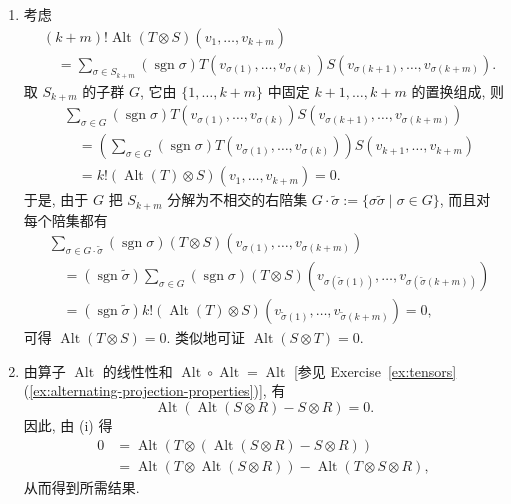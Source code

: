 \begin{RiemannProof}
\begin{enumerate}[label=(\roman*),leftmargin=*]
\item 考虑
\begin{align*}
  &(k+m)!\operatorname{Alt}(T\otimes S)(v_1,\ldots,v_{k+m})\\
  &\quad=\sum_{\sigma\in S_{k+m}}(\operatorname{sgn}\sigma)
  T(v_{\sigma(1)},\ldots,v_{\sigma(k)})S(v_{\sigma(k+1)},\ldots,v_{\sigma(k+m)}).
\end{align*}
取 $S_{k+m}$ 的子群 $G$, 它由 $\{1,\ldots,k+m\}$ 中固定 $k+1,\ldots,k+m$ 的置换组成, 则
\begin{align*}
  &\sum_{\sigma\in G}(\operatorname{sgn}\sigma)
    T(v_{\sigma(1)},\ldots,v_{\sigma(k)})S(v_{\sigma(k+1)},\ldots,v_{\sigma(k+m)})\\
  &\quad=\left(\sum_{\sigma\in G}(\operatorname{sgn}\sigma)
    T(v_{\sigma(1)},\ldots,v_{\sigma(k)})\right)S(v_{k+1},\ldots,v_{k+m})\\
  &\quad=k!(\operatorname{Alt}(T)\otimes S)(v_1,\ldots,v_{k+m})=0.
\end{align*}
于是, 由于 $G$ 把 $S_{k+m}$ 分解为不相交的右陪集 $G\cdot\widetilde\sigma:=\{\sigma\widetilde\sigma\mid\sigma\in G\}$, 而且对每个陪集都有
\begin{align*}
  &\sum_{\sigma\in G\cdot\widetilde\sigma}(\operatorname{sgn}\sigma)
     (T\otimes S)(v_{\sigma(1)},\ldots,v_{\sigma(k+m)})\\
  &\quad=(\operatorname{sgn}\widetilde\sigma)\sum_{\sigma\in G}
    (\operatorname{sgn}\sigma)(T\otimes S)
    (v_{\sigma(\widetilde\sigma(1))},\ldots,v_{\sigma(\widetilde\sigma(k+m))})\\
  &\quad=(\operatorname{sgn}\widetilde\sigma)k!(\operatorname{Alt}(T)\otimes S)
     (v_{\widetilde\sigma(1)},\ldots,v_{\widetilde\sigma(k+m)})=0,
\end{align*}
可得 $\operatorname{Alt}(T\otimes S)=0$. 类似地可证 $\operatorname{Alt}(S\otimes T)=0$.
\item 由算子 $\operatorname{Alt}$ 的线性性和 $\operatorname{Alt}\circ\operatorname{Alt}=\operatorname{Alt}$ [参见 Exercise~\ref{ex:tensors}(\ref{ex:alternating-projection-properties})], 有
\[
  \operatorname{Alt}(\operatorname{Alt}(S\otimes R)-S\otimes R)=0.
\]
因此, 由 (i) 得
\begin{align*}
  0&=\operatorname{Alt}(T\otimes(\operatorname{Alt}(S\otimes R)-S\otimes R))\\
   &=\operatorname{Alt}(T\otimes\operatorname{Alt}(S\otimes R))
     -\operatorname{Alt}(T\otimes S\otimes R),
\end{align*}
从而得到所需结果.
\end{enumerate}
\end{RiemannProof}

